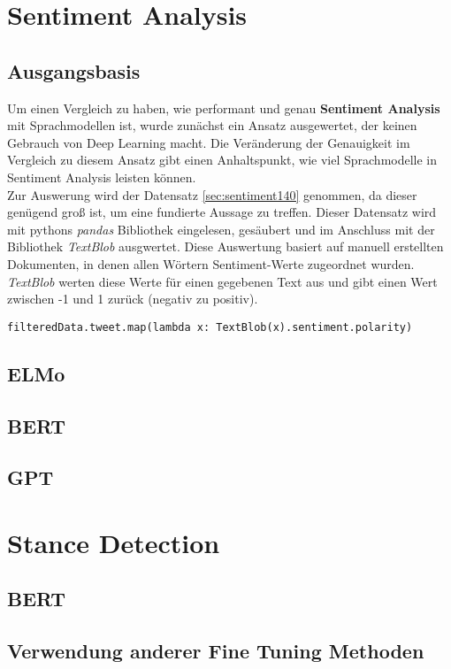 \section{Sentiment Analysis}



\subsection{Ausgangsbasis}
Um einen Vergleich zu haben, wie performant und genau \textbf{Sentiment Analysis} mit Sprachmodellen ist, wurde zun\"achst ein Ansatz ausgewertet, der keinen Gebrauch von Deep Learning macht. Die Ver\"anderung der Genauigkeit im Vergleich zu diesem Ansatz gibt einen Anhaltspunkt, wie viel Sprachmodelle in Sentiment Analysis leisten k\"onnen.\\
Zur Auswerung wird der Datensatz \ref{sec:sentiment140} genommen, da dieser gen\"ugend gro{\ss} ist, um eine fundierte Aussage zu treffen. Dieser Datensatz wird mit pythons \textit{pandas} Bibliothek eingelesen, ges\"aubert und im Anschluss mit der Bibliothek \textit{TextBlob} ausgwertet. Diese Auswertung basiert auf manuell erstellten Dokumenten, in denen allen W\"ortern Sentiment-Werte zugeordnet wurden. \textit{TextBlob} werten diese Werte f\"ur einen gegebenen Text aus und gibt einen Wert zwischen -1 und 1 zur\"uck (negativ zu positiv).
\lstset{language=Python}
\lstset{frame=lines}
\lstset{captionpos=b}
\lstset{basicstyle=\footnotesize}
\begin{lstlisting}
filteredData.tweet.map(lambda x: TextBlob(x).sentiment.polarity)
\end{lstlisting}

\subsection{ELMo}

\subsection{BERT}

\subsection{GPT}

\section{Stance Detection}

\subsection{BERT}

\subsection{Verwendung anderer Fine Tuning Methoden}